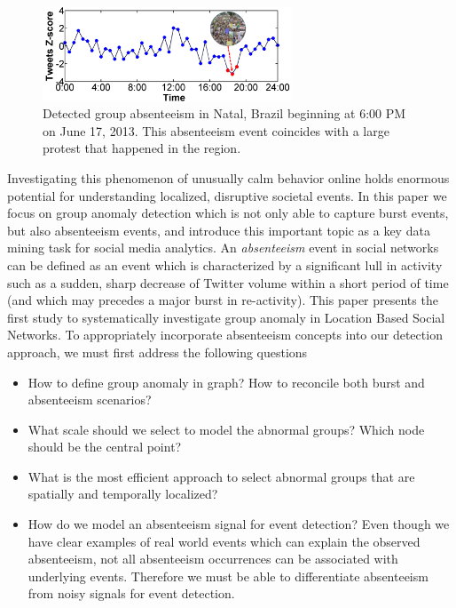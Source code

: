 \documentclass[conference]{IEEEtran}
\begin{document}
\begin{figure}[t]
\centering
\includegraphics[height=1.1in]{figures/Natal_example1.png}
\caption{Detected group absenteeism in Natal, Brazil beginning at 6:00 PM on June 17, 2013. This absenteeism event coincides with a large protest that happened in the region.}
\label{fig:natal-protest}
\end{figure}
Investigating this phenomenon of unusually calm behavior online holds enormous potential for understanding localized, disruptive societal events.
In this paper we focus on group anomaly detection which is not only able to capture burst events, but also absenteeism events, and introduce this important topic as a key data mining task for social media analytics.
An \textit{absenteeism} event in social networks can be defined as an event which is characterized by a significant lull in activity such as a sudden, sharp decrease of Twitter volume within a short period of time (and which may precedes a major burst in re-activity).
This paper presents the first study to systematically investigate group anomaly in Location Based Social Networks.
To appropriately incorporate absenteeism concepts into our detection approach, we must first address the following questions
\begin{itemize}
\item How to define group anomaly in graph? How to reconcile both burst and absenteeism scenarios?
\item What scale should we select to model the abnormal groups? Which node should be the central point?
\item What is the most efficient approach to select abnormal groups that are spatially and temporally localized?
\item How do we model an absenteeism signal for event detection? Even though we have clear examples of real world events which can explain the observed absenteeism, not all absenteeism occurrences can be associated with underlying events. Therefore we must be able to differentiate absenteeism from noisy signals for event detection.
\end{itemize}
\end{document}
